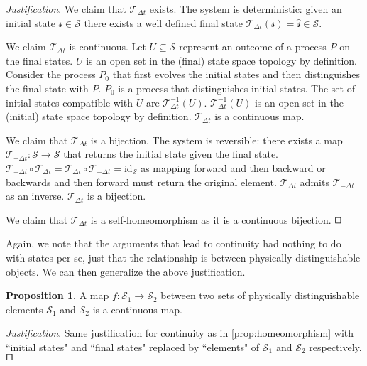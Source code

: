 \documentclass[smallextended]{svjour3}
\numberwithin{equation}{section}
\newenvironment{justification}{\emph{Justification}.}{\hfill\(\qed\)}
\theoremstyle{definition}
\newtheorem{prop}[equation]{Proposition}
\newenvironment{justification}{\emph{Justification}.}{\qed}
\newcommand{\id}{\textrm{id}}
\begin{document}
\begin{justification}
We claim that $\mathcal{T}_{\Delta t}$ exists. The system is deterministic: given an initial state $\mathcal{s} \in \mathcal{S}$ there exists a well defined final state $\mathcal{T}_{\Delta t}(\mathcal{s})=\hat{\mathcal{s}} \in \mathcal{S}$.

We claim $\mathcal{T}_{\Delta t}$ is continuous. Let $U \subseteq \mathcal{S}$ represent an outcome of a process $P$ on the final states. $U$ is an open set in the (final) state space topology by definition. Consider the process $P_0$ that first evolves the initial states and then distinguishes the final state with $P$. $P_0$ is a process that distinguishes initial states. The set of initial states compatible with $U$ are $\mathcal{T}_{\Delta t}^{-1}(U)$. $\mathcal{T}_{\Delta t}^{-1}(U)$ is an open set in the (initial) state space topology by definition. $\mathcal{T}_{\Delta t}$ is a continuous map.

We claim that $\mathcal{T}_{\Delta t}$ is a bijection. The system is reversible: there exists a map $\mathcal{T}_{-\Delta t}:\mathcal{S} \rightarrow \mathcal{S}$ that returns the initial state given the final state. $\mathcal{T}_{-\Delta t} \circ \mathcal{T}_{\Delta t} = \mathcal{T}_{\Delta t} \circ \mathcal{T}_{-\Delta t} = \id_{\mathcal{S}}$ as mapping forward and then backward or backwards and then forward must return the original element. $\mathcal{T}_{\Delta t}$ admits $\mathcal{T}_{-\Delta t}$ as an inverse. $\mathcal{T}_{\Delta t}$ is a bijection.

We claim that $\mathcal{T}_{\Delta t}$ is a self-homeomorphism as it is a continuous bijection.
\end{justification}

Again, we note that the arguments that lead to continuity had nothing to do with states per se, just that the relationship is between physically distinguishable objects. We can then generalize the above justification.

\begin{prop}\label{prop:continuity}
	A map $f:\mathcal{S_1} \rightarrow \mathcal{S_2}$ between two sets of physically distinguishable elements $\mathcal{S_1}$ and $\mathcal{S_2}$ is a continuous map.
\end{prop}

\begin{justification}
	Same justification for continuity as in \ref{prop:homeomorphism} with ``initial states" and ``final states" replaced by ``elements" of $\mathcal{S_1}$ and $\mathcal{S_2}$ respectively.
\end{justification}
\end{document}
